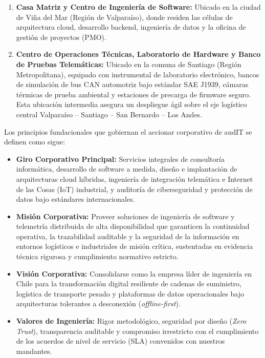 \begin{enumerate}
  \item \textbf{Casa Matriz y Centro de Ingeniería de Software:} Ubicado en la ciudad de Viña del Mar (Región de Valparaíso), donde residen las células de arquitectura cloud, desarrollo backend, ingeniería de datos y la oficina de gestión de proyectos (PMO).
  \item \textbf{Centro de Operaciones Técnicas, Laboratorio de Hardware y Banco de Pruebas Telemáticas:} Ubicado en la comuna de Santiago (Región Metropolitana), equipado con instrumental de laboratorio electrónico, bancos de simulación de bus CAN automotriz bajo estándar SAE J1939, cámaras térmicas de prueba ambiental y estaciones de precarga de firmware seguro. Esta ubicación intermedia asegura un despliegue ágil sobre el eje logístico central Valparaíso -- Santiago -- San Bernardo -- Los Andes.
\end{enumerate}

Los principios fundacionales que gobiernan el accionar corporativo de audIT se definen como sigue:

\begin{itemize}
  \item \textbf{Giro Corporativo Principal:} Servicios integrales de consultoría informática, desarrollo de software a medida, diseño e implantación de arquitecturas cloud híbridas, ingeniería de integración telemática e Internet de las Cosas (IoT) industrial, y auditoría de ciberseguridad y protección de datos bajo estándares internacionales.
  \item \textbf{Misión Corporativa:} Proveer soluciones de ingeniería de software y telemetría distribuida de alta disponibilidad que garanticen la continuidad operativa, la trazabilidad auditable y la seguridad de la información en entornos logísticos e industriales de misión crítica, sustentadas en evidencia técnica rigurosa y cumplimiento normativo estricto.
  \item \textbf{Visión Corporativa:} Consolidarse como la empresa líder de ingeniería en Chile para la transformación digital resiliente de cadenas de suministro, logística de transporte pesado y plataformas de datos operacionales bajo arquitecturas tolerantes a desconexión (\textit{offline-first}).
  \item \textbf{Valores de Ingeniería:} Rigor metodológico, seguridad por diseño (\textit{Zero Trust}), transparencia auditable y compromiso irrestricto con el cumplimiento de los acuerdos de nivel de servicio (SLA) convenidos con nuestros mandantes.
\end{itemize}

